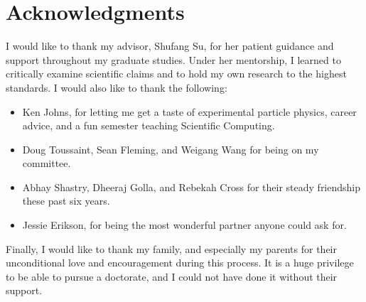 \chapter*{Acknowledgments}

I would like to thank my advisor, Shufang Su, for her patient guidance and support throughout my graduate studies. Under her mentorship, I learned to critically examine scientific claims and to hold my own research to the highest standards. 
I would also like to thank the following:
\begin{itemize}
\item Ken Johns, for letting me get a taste of experimental particle physics, career advice, and a fun semester teaching Scientific Computing.
\item Doug Toussaint, Sean Fleming, and Weigang Wang for being on my committee.
\item Abhay Shastry, Dheeraj Golla, and Rebekah Cross for their steady friendship these past six years.
\item Jessie Erikson, for being the most wonderful partner anyone could ask for.
\end{itemize}
Finally, I would like to thank my family, and especially my parents for their unconditional love and encouragement during this process. It is a huge privilege to be able to pursue a doctorate, and I could not have done it without their support.
